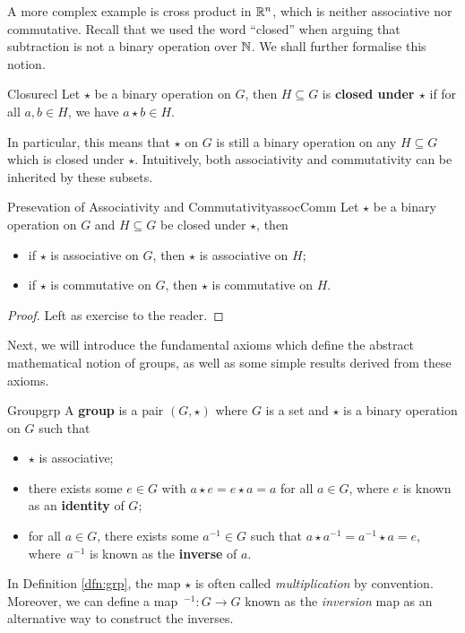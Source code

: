 \documentclass[math]{amznotes}
\theoremstyle{remark}
\newcommand{\0}{\mathbf{0}}
\newcommand{\1}{\mathbf{1}}
\begin{document}
A more complex example is cross product in $\mathbb{R}^n$, which is neither associative nor commutative. Recall that we used the word ``closed'' when arguing that subtraction is not a binary operation over $\mathbb{N}$. We shall further formalise this notion.
\begin{dfnbox}{Closure}{cl}
    Let $\star$ be a binary operation on $G$, then $H \subseteq G$ is {\color{red} \textbf{closed under $\star$}} if for all $a, b \in H$, we have $a \star b \in H$.
\end{dfnbox}
In particular, this means that $\star$ on $G$ is still a binary operation on any $H \subseteq G$ which is closed under $\star$. Intuitively, both associativity and commutativity can be inherited by these subsets.
\begin{probox}{Presevation of Associativity and Commutativity}{assocComm}
    Let $\star$ be a binary operation on $G$ and $H \subseteq G$ be closed under $\star$, then 
    \begin{itemize}
        \item if $\star$ is associative on $G$, then $\star$ is associative on $H$;
        \item if $\star$ is commutative on $G$, then $\star$ is commutative on $H$.
    \end{itemize}
    \tcblower
    \begin{proof}
        Left as exercise to the reader.
    \end{proof}
\end{probox}
Next, we will introduce the fundamental axioms which define the abstract mathematical notion of groups, as well as some simple results derived from these axioms.
\begin{dfnbox}{Group}{grp}
    A {\color{red} \textbf{group}} is a pair $\left(G, \star\right)$ where $G$ is a set and $\star$ is a binary operation on $G$ such that 
    \begin{itemize}
        \item $\star$ is associative;
        \item there exists some $e \in G$ with $a \star e = e \star a = a$ for all $a \in G$, where $e$ is known as an {\color{red} \textbf{identity}} of $G$; 
        \item for all $a \in G$, there exists some $a^{-1} \in G$ such that $a \star a^{-1} = a^{-1} \star a = e$, where~$a^{-1}$ is known as the {\color{red} \textbf{inverse}} of $a$.
    \end{itemize}
\end{dfnbox}
In Definition \ref{dfn:grp}, the map $\star$ is often called \textit{multiplication} by convention. Moreover, we can define a map $\,^{-1} \colon G \to G$ known as the \textit{inversion} map as an alternative way to construct the inverses.
\end{document}
